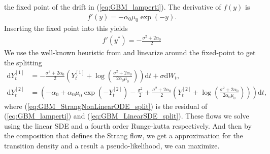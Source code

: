 the fixed point of the drift in (\ref{eq:GBM_lamperti}). The derivative of $f(y)$ is 
\begin{align}
    f'(y) = -\alpha_0\mu_0\exp(-y).
\end{align}
Inserting the fixed point into this yields
\begin{align}
    f'(y^*) = -\frac{\sigma^2 + 2\alpha_0}{2}
\end{align}
We use the well-known heuristic from \cite{SplittingSchemes} and linearize around the fixed-point to get the splitting
\begin{align}
    \mathrm{d}Y_t^{[1]} &= - \frac{\sigma^2 + 2\alpha_0}{2}\left(Y_t^{[1]} + \log\left(\frac{\sigma^2 + 2\alpha_0}{2\alpha_0 \mu_0}\right)\right)\mathrm{d}t + \sigma \mathrm{d}W_t, \label{eq:GBM_LinearSDE_split}\\
    \mathrm{d}Y_t^{[2]} &= \left(-\alpha_0 + \alpha_0\mu_0\exp(-Y_t^{[2]}) - \frac{\sigma^2}{2} + \frac{\sigma^2+2\alpha_0}{2}\left(Y_t^{[2]} + \log\left(\frac{\sigma^2+2\alpha_0}{2\alpha_0\mu_0}\right)\right)\right)\mathrm{d}t, \label{eq:GBM_StrangNonLinearODE_split}
\end{align}
where (\ref{eq:GBM_StrangNonLinearODE_split}) is the residual of (\ref{eq:GBM_lamperti}) and (\ref{eq:GBM_LinearSDE_split}).
These flows we solve using the linear SDE and a fourth order Runge-kutta respectively. And then by the composition that defines the Strang flow, we get a approximation for the transition density and a result a pseudo-likelihood, we can maximize.


